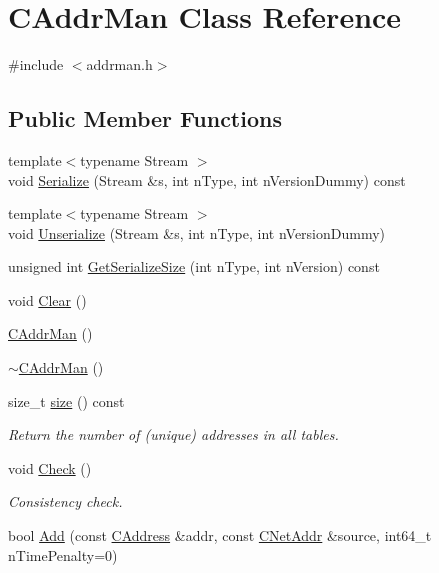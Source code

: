 \hypertarget{class_c_addr_man}{}\section{C\+Addr\+Man Class Reference}
\label{class_c_addr_man}


{\ttfamily \#include $<$addrman.\+h$>$}

\subsection*{Public Member Functions}
\begin{DoxyCompactItemize}
\item 
{\footnotesize template$<$typename Stream $>$ }\\void \mbox{\hyperlink{class_c_addr_man_a08668d8cf435750a80316b4708bbc9eb}{Serialize}} (Stream \&s, int n\+Type, int n\+Version\+Dummy) const
\item 
{\footnotesize template$<$typename Stream $>$ }\\void \mbox{\hyperlink{class_c_addr_man_a68eaf1797ecb8bff380aa7f9fc452e14}{Unserialize}} (Stream \&s, int n\+Type, int n\+Version\+Dummy)
\item 
unsigned int \mbox{\hyperlink{class_c_addr_man_a958c50de16b0d7fa068cce22a4cd8cb9}{Get\+Serialize\+Size}} (int n\+Type, int n\+Version) const
\item 
void \mbox{\hyperlink{class_c_addr_man_a53c27520b7f8c6fa817c2fa869dd4e25}{Clear}} ()
\item 
\mbox{\hyperlink{class_c_addr_man_ad9179d1c36c2ea3492e221576f340d33}{C\+Addr\+Man}} ()
\item 
\mbox{\hyperlink{class_c_addr_man_ae1b1838e4de4effbc1fbc888126a9352}{$\sim$\+C\+Addr\+Man}} ()
\item 
size\+\_\+t \mbox{\hyperlink{class_c_addr_man_a244508e8463c4fdfd8b085fcb3b5a225}{size}} () const
\begin{DoxyCompactList}\small\item\em Return the number of (unique) addresses in all tables. \end{DoxyCompactList}\item 
void \mbox{\hyperlink{class_c_addr_man_a0c2677ae50ce0d680f0105b285d1f5d0}{Check}} ()
\begin{DoxyCompactList}\small\item\em Consistency check. \end{DoxyCompactList}\item 
bool \mbox{\hyperlink{class_c_addr_man_a03fcc7109b5f014760dc50a81f68c5ec}{Add}} (const \mbox{\hyperlink{class_c_address}{C\+Address}} \&addr, const \mbox{\hyperlink{class_c_net_addr}{C\+Net\+Addr}} \&source, int64\+\_\+t n\+Time\+Penalty=0)

\end{DoxyCompactItemize}
